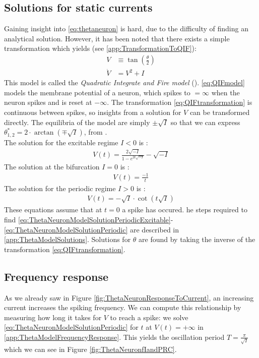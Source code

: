 \subsection{Solutions for static currents} \label{sec:TheThetaNeuronModelSolutionPeriodics}
Gaining insight into \eqref{eq:thetaneuron} is hard, due to the difficulty of finding an analytical solution. However, it has been noted that there exists a simple transformation which yields (see \ref{app:TransformationToQIF}):
\begin{align}
V &\equiv \tan \left( \frac{\theta}{2} \right) \label{eq:QIFtransformation} \\
\dot{V} &= V^2 + I \label{eq:QIFmodel}
\end{align}
This model is called the \textsl{Quadratic Integrate and Fire model} (\QIF). \eqref{eq:QIFmodel} models the membrane potential of a neuron, which spikes to $=\infty$ when the neuron spikes and is reset at $-\infty$. The transformation \eqref{eq:QIFtransformation} is continuous between spikes, so insights from a solution for $V$ can be transformed directly. The equilibria of the \QIF model are simply $\pm \sqrt{I}$ so that we can express $\theta^{\ast}_{1, 2} = 2 \cdot\arctan \left( \mp \sqrt{I} \right)$, from \cite{Gutkin2014}. \\

The solution for the excitable regime $I < 0$ is :
\begin{align}
V(t) = \frac{2 \sqrt{-I}}{1 - e^{2 t \sqrt{-I}}}-\sqrt{-I} \label{eq:ThetaNeuronModelSolutionPeriodicExcitable}
\end{align}
The solution at the bifurcation $I = 0$ is :
\begin{align}
V(t) = \frac{-1}{t} \label{eq:ThetaNeuronModelSolutionPeriodicBifurcation}
\end{align}
The solution for the periodic regime $I > 0$ is :
\begin{align}
V(t) = -\sqrt{I} \cdot \cot (t \sqrt{I}) \label{eq:ThetaNeuronModelSolutionPeriodic}
\end{align}
These equations assume that at $t=0$ a spike has occured. he steps required to find \eqref{eq:ThetaNeuronModelSolutionPeriodicExcitable}-\eqref{eq:ThetaNeuronModelSolutionPeriodic} are described in \ref{app:ThetaModelSolutions}. Solutions for $\theta$ are found by taking the inverse of the transformation \eqref{eq:QIFtransformation}.

\subsection{Frequency response} \label{sec:TheThetaNeuronModelFrequencyResponse}
As we already saw in Figure \ref{fig:ThetaNeuronResponseToCurrent}, an increasing current increases the spiking frequency. We can compute this relationship by measuring how long it takes for $V$ to reach a spike: we solve \eqref{eq:ThetaNeuronModelSolutionPeriodic} for $t$ at $V(t) = +\infty$ in \ref{app:ThetaModelFrequencyResponse}. This yields the oscillation period $T = \frac{\pi}{\sqrt{I}}$ which we can see in Figure \ref{fig:ThetaNeuronfIandPRC}. 


